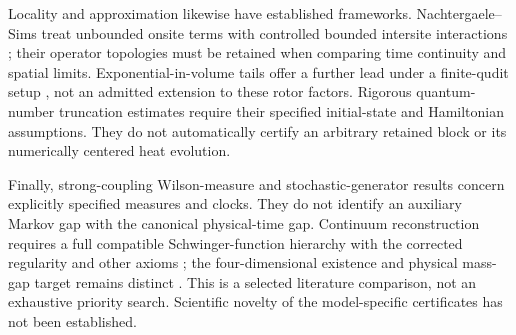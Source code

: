 Locality and approximation likewise have established frameworks.
Nachtergaele--Sims treat unbounded onsite terms with controlled bounded
intersite interactions \cite{nachtergaele2014dynamics}; their operator
topologies must be retained when comparing time continuity and spatial
limits. Exponential-in-volume tails offer a further lead under a
finite-qudit setup \cite{mcdonough2025volume}, not an admitted extension
to these rotor factors. Rigorous quantum-number truncation estimates
\cite{tong2022simulation} require their specified initial-state and
Hamiltonian assumptions. They do not automatically certify an arbitrary
retained block or its numerically centered heat evolution.

Finally, strong-coupling Wilson-measure and stochastic-generator results
\cite{shen2022strong} concern explicitly specified measures and clocks.
They do not identify an auxiliary Markov gap with the canonical
physical-time gap. Continuum reconstruction requires a full compatible
Schwinger-function hierarchy with the corrected regularity and other
axioms \cite{osterwalder1975axioms}; the four-dimensional existence and
physical mass-gap target remains distinct \cite{jaffe_witten}.
This is a selected literature comparison, not an exhaustive priority
search. Scientific novelty of the model-specific certificates has not
been established.
